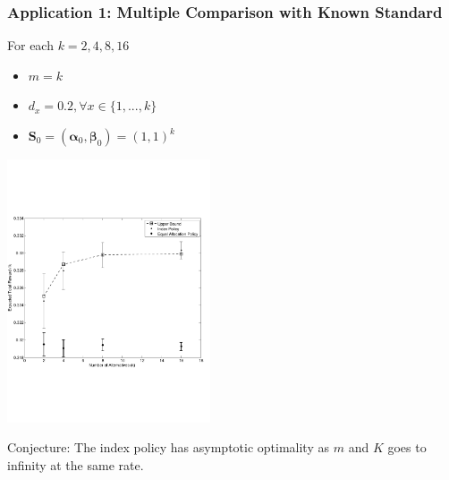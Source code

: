 \documentclass{beamer}
\newcommand{\Sv}{\mathbf{S}}
\newcommand{\betav}{\pmb{\beta}}
\newcommand{\alphav}{\pmb{\alpha}}
\begin{document}
\begin{frame}[plain]
\frametitle{Application 1: Multiple Comparison with Known Standard}
For each $k=2,4,8,16$
\begin{itemize}
\item $m = k$
\item $d_x = 0.2, \forall x \in \{1,...,k\}$
\item $\Sv_0=(\alphav_0,\betav_0)=(1,1)^k$
\end{itemize}
\vspace{-1cm}
\begin{center}
\includegraphics[width=60mm]{simPlots_0707_cropped.pdf}
\end{center}
Conjecture: The index policy has asymptotic optimality as $m$ and $K$ goes to infinity at the same rate.
\end{frame}

\end{document}
